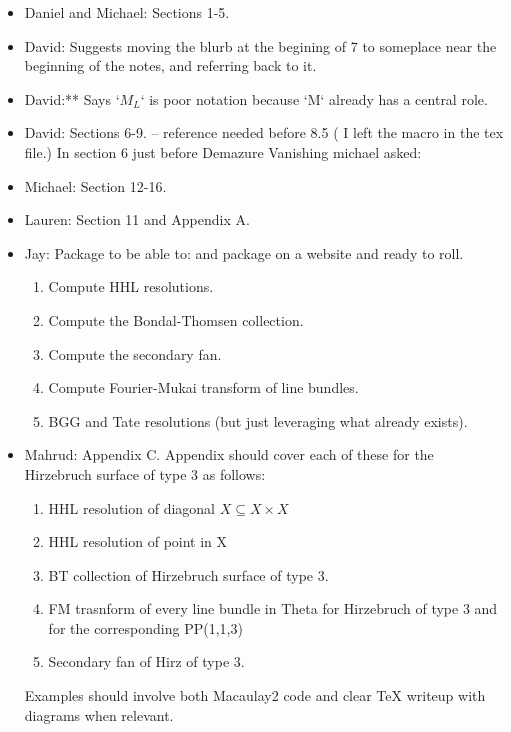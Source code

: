 \begin{itemize}
\item Daniel and Michael: Sections 1-5.

\item  David: Suggests moving the blurb at the begining of 7 to someplace near the beginning of the notes, and referring back to it. 
\item David:** Says `$M_L$` is poor notation because `M` already has a central role.
\item David: Sections 6-9. -- reference needed before 8.5 ( I left the  macro in the tex file.) 
In section 6 just before Demazure Vanishing michael asked:

\item Michael: Section 12-16.
\item Lauren: Section 11 and Appendix A.

\item Jay: Package to be able to: and package on a website and ready to roll.
  \begin{enumerate}
  \item Compute HHL resolutions.
  \item Compute the Bondal-Thomsen collection.
  \item Compute the secondary fan.
  \item Compute Fourier-Mukai transform of line bundles.
  \item BGG and Tate resolutions (but just leveraging what already exists).
  \end{enumerate}

\item Mahrud: Appendix C. Appendix should cover each of these for the Hirzebruch surface of type 3 as follows:
  \begin{enumerate}
  \item HHL resolution of diagonal $X \subseteq X \times X$
  \item HHL resolution of point in X
  \item BT collection of Hirzebruch surface of type 3.
  \item FM trasnform of every line bundle in Theta for Hirzebruch of type 3 and for the corresponding PP(1,1,3)
  \item Secondary fan of Hirz of type 3.
  \end{enumerate}
  Examples should involve both Macaulay2 code and clear TeX writeup with diagrams when relevant.


\end{itemize}
